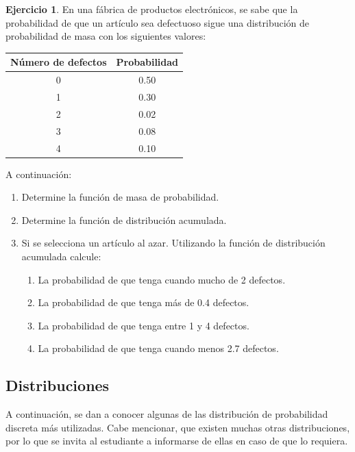 \documentclass[
  11pt,
]{book}
\providecommand{\tightlist}{%
  \setlength{\itemsep}{0pt}\setlength{\parskip}{0pt}}
\theoremstyle{definition}
\theoremstyle{definition}
\theoremstyle{definition}
\newtheorem{exercise}{Ejercicio}[chapter]
\theoremstyle{definition}
\theoremstyle{remark}
\begin{document}
\begin{exercise}

En una fábrica de productos electrónicos, se sabe que la probabilidad de que un artículo sea defectuoso sigue una distribución de probabilidad de masa con los siguientes valores:

\begin{table}[H]
\centering
\begin{tabular}[t]{cc}
\toprule
Número de defectos & Probabilidad\\
\midrule
0 & 0.50\\
1 & 0.30\\
2 & 0.02\\
3 & 0.08\\
4 & 0.10\\
\bottomrule
\end{tabular}
\end{table}

A continuación:

\begin{enumerate}
\def\labelenumi{\arabic{enumi}.}
\tightlist
\item
  Determine la función de masa de probabilidad.
\item
  Determine la función de distribución acumulada.
\item
  Si se selecciona un artículo al azar. Utilizando la función de distribución acumulada calcule:

  \begin{enumerate}
  \def\labelenumii{\alph{enumii}.}
  \tightlist
  \item
    La probabilidad de que tenga cuando mucho de 2 defectos.
  \item
    La probabilidad de que tenga más de 0.4 defectos.
  \item
    La probabilidad de que tenga entre 1 y 4 defectos.
  \item
    La probabilidad de que tenga cuando menos 2.7 defectos.
  \end{enumerate}
\end{enumerate}

\end{exercise}

\subsection{Distribuciones}\label{probabilidad-variable-aleatoria-discreta-distribuciones}

A continuación, se dan a conocer algunas de las distribución de probabilidad discreta más utilizadas. Cabe mencionar, que existen muchas otras distribuciones, por lo que se invita al estudiante a informarse de ellas en caso de que lo requiera.
\end{document}
